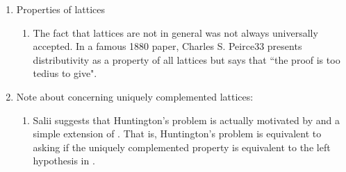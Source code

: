 \begin{survey}
\begin{enumerate}
  \item Properties of lattices
    \begin{enumerate}
      \item The fact that lattices are not in general  was 
            not always universally accepted. 
            In a famous 1880 paper, Charles S. Peirce\citep{peirce1880ajm}{33} 
            presents distributivity as a property of all lattices but says that 
            ``the proof is too tedius to give".
    \end{enumerate} 

  \item Note about  concerning uniquely complemented lattices: \label{lit:lat_hprob}
    \begin{enumerate}
      \item Salii 
            suggests that Huntington's problem is actually motivated by and a simple extension of
             .
            That is, Huntington's problem is equivalent to asking if
            the uniquely complemented property is equivalent to the left hypothesis
            in .


\end{enumerate}
\end{enumerate}
\end{survey}
